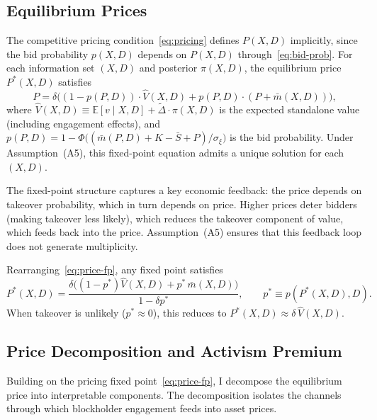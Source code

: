 \documentclass[11pt]{article}
\newcommand{\E}{\mathbb{E}}
\newcommand{\1}{\mathbf{1}}
\begin{document}
%
\subsection{Equilibrium Prices}
\label{sec:prices}
%

The competitive pricing condition~\eqref{eq:pricing} defines $P(X,D)$ implicitly, since the bid probability $p(X,D)$ depends on $P(X,D)$ through~\eqref{eq:bid-prob}. For each information set $(X,D)$ and posterior $\pi(X,D)$, the equilibrium price $P^*(X,D)$ satisfies
\begin{equation}
P = \delta\Big((1-p(P,D)) \cdot \hat{V}(X,D) + p(P,D) \cdot (P + \bar{m}(X,D))\Big),
\label{eq:price-fp}
\end{equation}
where $\hat{V}(X,D) \equiv \E[v \mid X,D] + \tilde{\Delta} \cdot \pi(X,D)$ is the expected standalone value (including engagement effects), and $p(P,D) = 1 - \Phi\big((\bar{m}(P,D) + K - \bar{S} + P)/\sigma_\xi\big)$ is the bid probability. Under Assumption~\textup{(A5)}, this fixed-point equation admits a unique solution for each $(X,D)$.

The fixed-point structure captures a key economic feedback: the price depends on takeover probability, which in turn depends on price. Higher prices deter bidders (making takeover less likely), which reduces the takeover component of value, which feeds back into the price. Assumption~\textup{(A5)} ensures that this feedback loop does not generate multiplicity.

Rearranging~\eqref{eq:price-fp}, any fixed point satisfies
\[
P^*(X,D)=\frac{\delta\big((1-p^*)\hat{V}(X,D)+p^*\,\bar{m}(X,D)\big)}{1-\delta p^*},
\qquad p^*\equiv p(P^*(X,D),D).
\]
When takeover is unlikely ($p^*\approx 0$), this reduces to $P^*(X,D)\approx \delta\,\hat{V}(X,D)$.

%
\subsection{Price Decomposition and Activism Premium}
%

Building on the pricing fixed point~\eqref{eq:price-fp}, I decompose the equilibrium price into interpretable components. The decomposition isolates the channels through which blockholder engagement feeds into asset prices.
\end{document}
